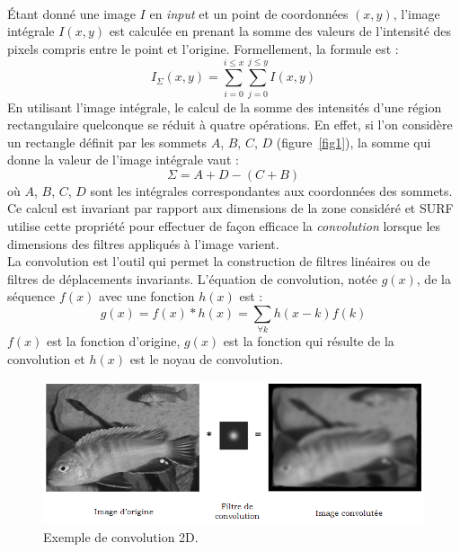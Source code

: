 \documentclass[a4paper,11pt]{report}
\begin{document}
\\Étant donné une image $I$ en \textit{input} et un point de coordonnées $(x,y)$, l'image intégrale $I(x,y)$ est calculée en prenant la somme des valeurs de l'intensité des pixels compris entre le point et l'origine. Formellement, la formule est :
$$I_{\Sigma}(x,y)=\sum_{i=0}^{i\leq x} \sum_{j=0}^{j\leq y} I(x,y)$$
En utilisant l'image intégrale, le calcul de la somme des intensités d'une région rectangulaire quelconque se réduit à quatre opérations. En effet, si l'on considère un rectangle définit par les sommets $A$, $B$, $C$, $D$ (figure~\ref{fig1}), la somme qui donne la valeur de l'image intégrale vaut :
$$ \Sigma = A+D-(C+B)$$
où $A$, $B$, $C$, $D$ sont les intégrales correspondantes aux coordonnées des sommets. Ce calcul est invariant par rapport aux dimensions de la zone considéré et SURF utilise cette propriété pour effectuer de façon efficace la \textit{convolution} lorsque les dimensions des filtres appliqués à l'image varient.
\\La convolution est l'outil qui permet la construction de filtres linéaires ou de filtres de déplacements invariants. L'équation de convolution, notée $g(x)$, de la séquence $f(x)$ avec une fonction $h(x)$ est :
$$g(x)=f(x)\ast h(x)=\sum_{\forall k}h(x-k)f(k)$$
$f(x)$ est la fonction d'origine, $g(x)$ est la fonction qui résulte de la convolution et $h(x)$ est le noyau de convolution.
\begin{figure}[ht]
\centering
\includegraphics[scale=0.3]{figure2.png}
\caption{Exemple de convolution 2D.}
\label{fig2}
\end{figure}
\end{document}
